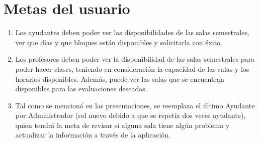 \documentclass{article}
\begin{document}
    \section{Metas del usuario}
    \begin{enumerate}
        \item Los ayudantes deben poder ver las disponibilidades de las salas semestrales, ver que días y que bloques están disponibles y solicitarla con éxito.
        \item Los profesores deben poder ver la disponibilidad de las salas semestrales para poder hacer clases, teniendo en consideración la capacidad de las salas y los horarios disponibles. Además, puede ver las salas que se encuentran disponibles para las evaluaciones deseadas.
        \item Tal como se mencionó en las presentaciones, se reemplaza el último Ayudante por Administrador (rol nuevo debido a que se repetía dos veces ayudante), quien tendrá la meta de revisar si alguna sala tiene algún problema y actualizar la información a través de la aplicación.
    \end{enumerate}
\end{document}
